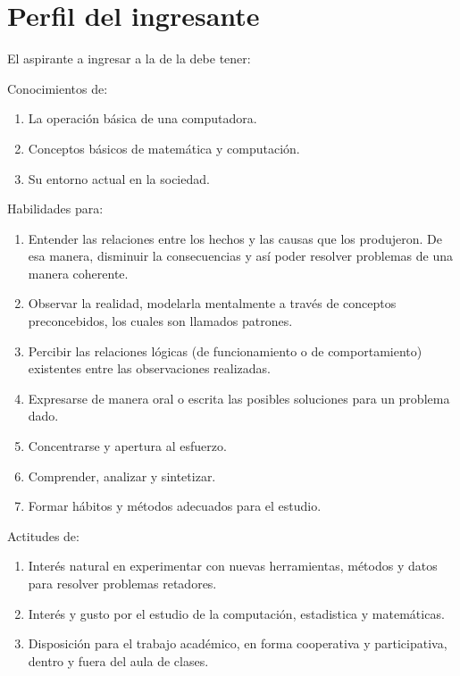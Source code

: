 \section{Perfil del ingresante}

El aspirante a ingresar a la \SchoolFullName de la \University debe tener:

\noindent Conocimientos de:
\begin{enumerate}
\item La operación básica de una computadora.
\item Conceptos básicos de matemática y computación.
\item Su entorno actual en la sociedad.
\end{enumerate}

\noindent Habilidades para:
\begin{enumerate}
\item Entender las relaciones entre los hechos y las causas que los produjeron. De esa manera, disminuir la consecuencias y así poder resolver problemas de una manera coherente.
\item Observar la realidad, modelarla mentalmente a través de conceptos preconcebidos, los cuales son llamados patrones.
\item Percibir las relaciones lógicas (de funcionamiento o de comportamiento) existentes entre las observaciones realizadas.
\item Expresarse de manera oral o escrita las posibles soluciones para un problema dado.
\item Concentrarse y apertura al esfuerzo.
\item Comprender, analizar y sintetizar.
\item Formar hábitos y métodos adecuados para el estudio.
\end{enumerate}

\noindent Actitudes de:
\begin{enumerate}
\item Interés natural en experimentar con nuevas herramientas, métodos y datos para resolver problemas retadores.
\item Interés y gusto por el estudio de la computación, estadistica y matemáticas.
\item Disposición para el trabajo académico, en forma cooperativa y participativa, dentro y fuera del aula de clases.
\end{enumerate}
